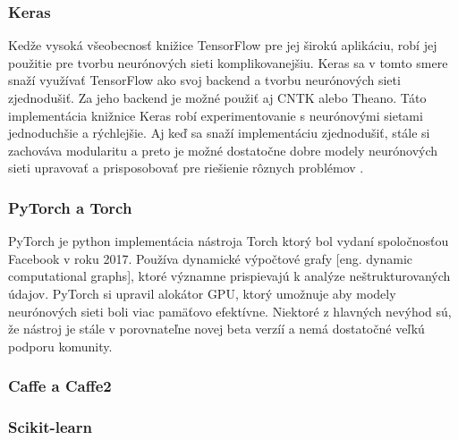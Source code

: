 \subsubsection{Keras}

Kedže vysoká všeobecnosť knižice TensorFlow pre jej širokú aplikáciu, robí jej použitie pre tvorbu neurónových sieti komplikovanejšiu.
Keras sa v tomto smere snaží využívať TensorFlow ako svoj backend a tvorbu neurónových sieti zjednodušiť.
Za jeho backend je možné použiť aj CNTK alebo Theano.
Táto implementácia knižnice Keras robí experimentovanie s neurónovými sietami jednoduchšie a rýchlejšie.
Aj keď sa snaží implementáciu zjednodušiť, stále si zachováva modularitu a preto je možné dostatočne dobre modely neurónových sieti upravovať a prisposobovať pre riešienie rôznych problémov \cite{odkaz:Keras}.

\subsubsection{PyTorch a Torch}

PyTorch je python implementácia nástroja Torch ktorý bol vydaní spoločnosťou Facebook v roku 2017.
Používa dynamické výpočtové grafy [eng. dynamic computational graphs], ktoré významne prispievajú k analýze neštrukturovaných údajov.
PyTorch si upravil alokátor GPU, ktorý umožnuje aby modely neurónových sieti boli viac pamäťovo efektívne.
Niektoré z hlavných nevýhod sú, že nástroj je stále v porovnateľne novej beta verzíí a nemá dostatočné veľkú podporu komunity.

\subsubsection{Caffe a Caffe2}



\subsubsection{Scikit-learn}


